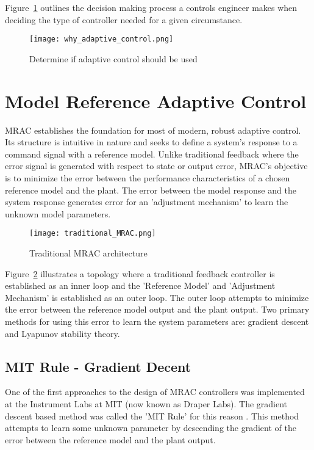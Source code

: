 Figure~\ref{fig:why_adaptive_control} outlines the decision making process a controls engineer makes when deciding the type of controller needed for a given circumstance.

\begin{figure}[h!]
 \centering
  \texttt{[image: why\_adaptive\_control.png]}
  \caption{Determine if adaptive control should be used}
  \label{fig:why_adaptive_control}
\end{figure}


\section{Model Reference Adaptive Control}
\ac{MRAC} establishes the foundation for most of modern, robust adaptive control.  Its structure is intuitive in nature and seeks to define a system's response to a command signal with a reference model.  Unlike traditional feedback where the error signal is generated with respect to state or output error, \ac{MRAC}'s objective is to minimize the error between the performance characteristics of a chosen reference model and the plant.  The error between the model response and the system response generates error for an 'adjustment mechanism' to learn the unknown model parameters.

\begin{figure}[h!]
 \centering
  \texttt{[image: traditional\_MRAC.png]}
  \caption{Traditional \ac{MRAC} architecture }
  \label{fig:traditional_mrac}
\end{figure}

Figure~\ref{fig:traditional_mrac} illustrates a topology where a traditional feedback controller is established as an inner loop and the 'Reference Model' and 'Adjustment Mechanism' is established as an outer loop.  The outer loop attempts to minimize the error between the reference model output and the plant output.  Two primary methods for using this error to learn the system parameters are: gradient descent and Lyapunov stability theory.

\subsection{MIT Rule - Gradient Decent}
One of the first approaches to the design of \ac{MRAC} controllers was implemented at the Instrument Labs at MIT (now known as Draper Labs).  The gradient descent based method was called the 'MIT Rule' for this reason \cite{aastrom2013adaptive}.  This method attempts to learn some unknown parameter by descending the gradient of the error between the reference model and the plant output.

